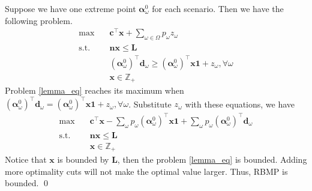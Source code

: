   \begin{pf}
    Suppose we have one extreme point $\bm{\alpha}_{\omega}^{0}$ for each scenario. Then we have the following problem.
    \begin{equation}\label{lemma_eq}
      \begin{aligned}
        \max \quad & \mathbf{c}^{\intercal} \mathbf{x} + \sum_{\omega \in \Omega} p_{\omega} z_{\omega} \\
        \text {s.t.} \quad & \mathbf{n} \mathbf{x} \leq \mathbf{L} \\
        & (\bm{\alpha}_{\omega}^{0})^{\intercal}\mathbf{d}_{\omega} \geq (\bm{\alpha}_{\omega}^{0})^{\intercal} \mathbf{x} \mathbf{1} + z_{\omega}, \forall \omega \\
         & \mathbf{x} \in \mathbb{Z}_{+}
      \end{aligned}
    \end{equation}
    Problem \eqref{lemma_eq} reaches its maximum when $(\bm{\alpha}_{\omega}^{0})^{\intercal}\mathbf{d}_{\omega} = (\bm{\alpha}_{\omega}^{0})^{\intercal} \mathbf{x} \mathbf{1} + z_{\omega}, \forall \omega$. Substitute $z_{\omega}$ with these equations, we have 
    \begin{equation}\label{lemma_eq2}
      \begin{aligned}
        \max \quad & \mathbf{c}^{\intercal} \mathbf{x} - \sum_{\omega}p_{\omega}(\bm{\alpha}_{\omega}^{0})^{\intercal} \mathbf{x} \mathbf{1} + \sum_{\omega} p_{\omega} (\bm{\alpha}_{\omega}^{0})^{\intercal} \mathbf{d}_{\omega} \\
        \text {s.t.} \quad & \mathbf{n} \mathbf{x} \leq \mathbf{L} \\
        & \mathbf{x} \in \mathbb{Z}_{+}
      \end{aligned}
    \end{equation}
    Notice that $\mathbf{x}$ is bounded by $\mathbf{L}$, then the problem \eqref{lemma_eq} is bounded. Adding more optimality cuts will not make the optimal value larger. Thus, RBMP is bounded. 
    \qed
  \end{pf}

